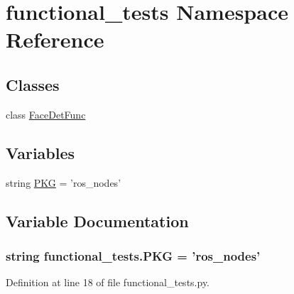 \hypertarget{namespacefunctional__tests}{\section{functional\-\_\-tests Namespace Reference}
\label{namespacefunctional__tests}
}
\subsection*{Classes}
\begin{DoxyCompactItemize}
\item 
class \hyperlink{classfunctional__tests_1_1FaceDetFunc}{Face\-Det\-Func}
\end{DoxyCompactItemize}
\subsection*{Variables}
\begin{DoxyCompactItemize}
\item 
string \hyperlink{namespacefunctional__tests_a78507f367d6307db1c1633379cbccc35}{P\-K\-G} = 'ros\-\_\-nodes'
\end{DoxyCompactItemize}


\subsection{Variable Documentation}
\hypertarget{namespacefunctional__tests_a78507f367d6307db1c1633379cbccc35}{
\subsubsection[{P\-K\-G}]{\setlength{\rightskip}{0pt plus 5cm}string functional\-\_\-tests.\-P\-K\-G = 'ros\-\_\-nodes'}}\label{namespacefunctional__tests_a78507f367d6307db1c1633379cbccc35}


Definition at line 18 of file functional\-\_\-tests.\-py.


